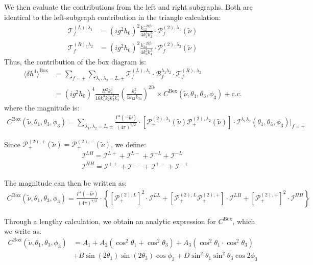 \documentclass[a4paper,12pt]{article}
\def\mc{\mathcal}
\def\la{\langle}\def\ra{\rangle}
\def\ii{\mathrm{i}}
\def\lam{\lambda}
\def\tn{\tilde\nu}
\begin{document}
We then evaluate the contributions from the left and right subgraphs. Both are identical to the left-subgraph contribution in the triangle calculation:
\begin{align}
    \mathcal{T}^{(L),\lam_1}_f 
    &= \left( ig^2h_0\right)^2 
    \frac{k_{12}^{-2\ii f\tn}}{4k_1^3 k_2^3}
    \cdot \mathcal{P}_f^{(2),\lam_1}(\tn) \\
    \mathcal{T}^{(R),\lam_2}_f 
    &= \left( ig^2h_0\right)^2 
    \frac{k_{34}^{-2\ii f\tn}}{4k_3^3 k_4^3}
    \cdot \mathcal{P}_f^{(2),\lam_2}(\tn)
\end{align}
Thus, the contribution of the box diagram is:
\begin{align}
    \la \delta h^4 \ra^{\text{Box}} 
    &= \sum_{f=\pm} \sum_{\lam_1,\lam_2=L,\pm} 
    \mc T^{(L),\lambda_1}_f  
    \cdot \mc B^{\lam_1\lam_2}_f 
    \cdot \mc T^{(R),\lam_2}_f \\
    &= (ig^2h_0)^4 
    \frac{H^2 k_s^3}{16 k_1^3 k_2^3 k_3^3 k_4^3} 
    \left( \frac{k_s^2}{4k_{12}k_{34}}\right)^{2\ii\tn} 
    \times C^{\text{Box}}(\tn,\theta_1,\theta_3,\phi_3) + \text{c.c.}
\end{align}
where the magnitude is:
\begin{align}
    C^{\text{Box}}(\tn,\theta_1,\theta_3,\phi_3) = 
    \sum_{\lam_1,\lam_2=L,\pm}
    \frac{\Gamma^4(-\ii \tn)}{(4\pi)^{7/2}} \cdot
    [\mathcal{P}^{(2),\lam_1}_+(\tn) \mc P^{(2),\lambda_2}_+(\tn) ]
    \cdot  
    \mathcal{I}^{\lambda_1\lam_2}(\theta_1,\theta_3,\phi_3)|_{f=+}
\end{align}

Since $\mathcal{P}^{(2),+}_+(\tn)=\mathcal{P}^{(2),-}_+(\tn)$, we define:
\begin{align}
    &\mathcal{I}^{LH} = \mc I^{L+} + \mc I^{L-} +\mc I^{+L} + \mc I^{-L} \\
    &\mathcal{I}^{HH} = \mc I^{++} + \mc I^{--} +\mc I^{+-} + \mc I^{-+}
\end{align}

The magnitude can then be written as:
\begin{align}
    C^{\text{Box}}(\tn,\theta_1,\theta_3,\phi_3) = 
    \frac{\Gamma^4(-\ii \tn)}{(4\pi)^{7/2}} \cdot
    \left\{
        [\mathcal{P}^{(2),L}_+]^2 \cdot  
        \mathcal{I}^{LL}
        + [\mathcal{P}^{(2),L}_+ \mc P^{(2),+}_+ ]\cdot  
        \mathcal{I}^{LH}
        + [\mathcal{P}^{(2),+}_+]^2 \cdot  
        \mathcal{I}^{HH}
    \right\}
\end{align}

Through a lengthy calculation, we obtain an analytic expression for $C^{\text{Box}}$, which we write as:
\begin{align}
    C^{\text{Box}}(\tn,\theta_1,\theta_3,\phi_3) &
    = A_1
    +A_2(\cos^2\theta_1 + \cos^2\theta_3)
    +A_3(\cos^2\theta_1 \cdot \cos^2\theta_3) \nonumber \\
    &+ B \sin(2\theta_1) \sin(2\theta_3) \cos \phi_3
    + D \sin^2\theta_1 \sin^2\theta_3 \cos 2\phi_3
\end{align}
\end{document}
